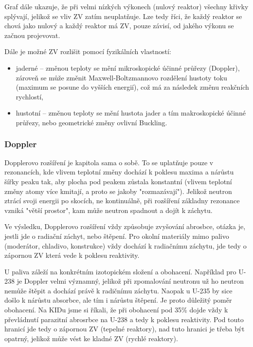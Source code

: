 Graf dále ukazuje, že při velmi nízkých výkonech (nulový reaktor) všechny křivky splývají, jelikož se vliv ZV zatím neuplatňuje. Lze tedy říci, že každý reaktor se chová jako nulový a každý reaktor má ZV, pouze závisí, od jakého výkonu se začnou projevovat.

Dále je možné ZV rozlišit pomocí fyzikálních vlastností:

\begin{itemize}
  \item jaderné -- změnou teploty se mění mikroskopické účinné průřezy (Doppler), zároveň se může změnit Maxwell-Boltzmannovo rozdělení hustoty toku (maximum se posune do vyšších energií), což má za následek změnu reakčních rychlostí,
  \item hustotní -- změnou teploty se mění hustota jader a tím makroskopické účinné průřezy, nebo geometrické změny ovlivní Buckling.
\end{itemize}

\subsubsection{Doppler}

Dopplerovo rozšíření je kapitola sama o sobě. To se uplatňuje pouze v rezonancích, kde vlivem teplotní změny dochází k poklesu maxima a nárůstu šířky peaku tak, aby plocha pod peakem zůstala konstantní (vlivem teplotní změny atomy více kmitají, a proto se jakoby "rozmazávají"). Jelikož neutron ztrácí svoji energii po skocích, ne kontinuálně, při rozšíření základny rezonance vzniká "větší prostor", kam může neutron spadnout a dojít k záchytu.

Ve výsledku, Dopplerovo rozšíření vždy způsobuje zvyšování abrosbce, otázka je, jestli jde o radiační záchyt, nebo štěpení. Pro okolní materiály mimo palivo (moderátor, chladivo, konstrukce) vždy dochází k radiačnímu záchytu, jde tedy o zápornou ZV která vede k poklesu reaktivity.

U paliva záleží na konkrétním izotopickém složení a obohacení. Například pro U-238 je Doppler velmi významný, jelikož při zpomalování neutronu už ho neutron nemůže štěpit a dochází právě k radičnímu záchytu. Naopak u U-235 by sice došlo k nárůstu absorbce, ale tím i nárůstu štěpení. Je proto důležitý poměr obohacení. Na KIDu jsme si říkali, že při obohacení pod 35\% dojde vždy k převládnutí parazitní abrosrbce na U-238 a tedy k poklesu reaktivity. Pod touto hranicí jde tedy o zápornou ZV (tepelné reaktory), nad tuto hranici je třeba být opatrný, jelikož může vést ke kladné ZV (rychlé reaktory).

